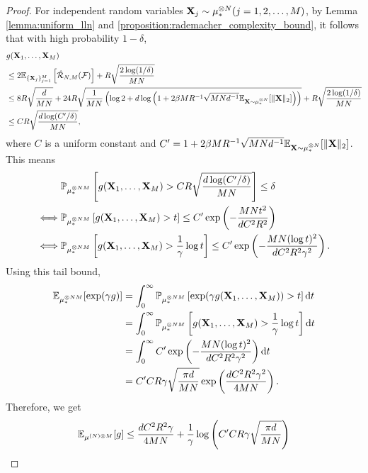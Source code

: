 \begin{proof}
    For independent random variables $\vX_j \sim \tensor[\mu,N]_* (j=1,2,\ldots,M)$, by Lemma \ref{lemma:uniform_lln} and \ref{proposition:rademacher_complexity_bound}, it follows that with high probability $1-\delta$,
    \begin{align*}
        &g(\vX_1,\ldots,\vX_M) \\
        &\leq 2\bE_{\{\vX_j\}_{j=1}^M}\left[\hat{\cR}_{N,M}(\cF)\right] 
        + R \sqrt{ \frac{2\log(1/\delta)}{MN}} \\
        &\leq 8 R\sqrt{\frac{d}{MN}}
        + 24R\sqrt{\frac{1}{MN} \left(\log 2 + d\log \left( 1 + 2\beta MR^{-1}\sqrt{MNd^{-1}}\bE_{\vX\sim\tensor[\mu,N]_*}[\|\vX\|_2]\right)\right)}
        + R \sqrt{ \frac{2\log(1/\delta)}{MN}}\\
        &\leq CR\sqrt{\frac{d\log(C'/\delta)}{MN}},
    \end{align*}
    where $C$ is a uniform constant and $C'=1 + 2\beta MR^{-1}\sqrt{MNd^{-1}}\bE_{\vX\sim\tensor[\mu,N]_*}[\|\vX\|_2]$.
    This means
    \begin{align*}
        &\mathbb{P}_{\mu^{\otimes N M}_*}\left[ g(\mathbf{X}_1,\ldots,\mathbf{X}_M) > CR\sqrt{\frac{d\log(C'/\delta)}{MN}} \right] \leq \delta \\
        \iff
        &\mathbb{P}_{\mu^{\otimes N M}_*}\left[ g(\mathbf{X}_1,\ldots,\mathbf{X}_M) > t \right] \leq C'\exp\left( - \frac{MNt^2}{dC^2R^2}\right) \\
        \iff
        &\mathbb{P}_{\mu^{\otimes N M}_*}\left[ g(\mathbf{X}_1,\ldots,\mathbf{X}_M) > \frac{1}{\gamma}\log t \right] \leq C'\exp\left( - \frac{MN(\log t)^2}{dC^2R^2\gamma^2}\right).
    \end{align*}
    Using this tail bound, 
    \begin{align*}
        \mathbb{E}_{\mu^{\otimes N M}_*}[\exp(\gamma g)]
        &=\int_0^\infty \mathbb{P}_{\mu^{\otimes N M}_*}\left[ \exp(\gamma g(\mathbf{X}_1,\ldots,\mathbf{X}_M)) > t \right] \mathrm{d} t \\
        &=\int_0^\infty \mathbb{P}_{\mu^{\otimes N M}_*}\left[ g(\mathbf{X}_1,\ldots,\mathbf{X}_M) > \frac{1}{\gamma} \log t \right] \mathrm{d} t \\
        &=\int_0^\infty C'\exp\left( - \frac{MN(\log t)^2}{dC^2R^2\gamma^2} \right) \mathrm{d} t \\
        &=C'CR\gamma\sqrt{\frac{\pi d}{MN}}\exp\left( \frac{dC^2R^2\gamma^2}{4MN} \right).
    \end{align*}
    Therefore, we get
    \begin{equation*}
        \bE_{\mu^{(N)\otimes M}}[g]
        \leq \frac{dC^2R^2\gamma}{4MN} + \frac{1}{\gamma}\log\left( C'CR\gamma\sqrt{\frac{\pi d}{MN}} \right)

\end{equation*}
\end{proof}

